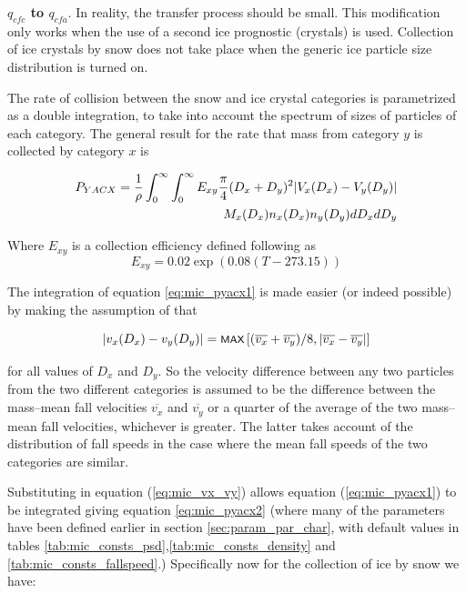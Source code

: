 \documentclass{UMDP_article}
\newcommand{\mmax}[1] {\mbox{\footnotesize \sf MAX} \left[#1\right]  }
\def\bq{\begin{equation}}
\def\eq{\end{equation}}
\begin{document}
\textbf{$q_{cfc}$ to $q_{cfa}$}.
In reality, the
transfer process should be small. This modification only works when the use of 
a second ice prognostic (crystals) is used. Collection of ice crystals by snow
does not take place when the generic ice particle size distribution is turned 
on.

The rate of collision between the snow and ice crystal categories is
parametrized as a double integration, to take into account the spectrum of
sizes of particles of each category.
The general result for the rate that mass from category $y$ is collected 
by category $x$ is

\begin{eqnarray}
 P_{YACX}=\frac{1}{\rho}
          \int_0^\infty\int_0^\infty E_{xy}\frac{\pi}{4}(D_x+D_y)^2
         | V_x(D_x) - V_y(D_y)|
                         \nonumber \\
          \hspace{0.5cm}M_x(D_x) n_x(D_x) n_y(D_y) dD_x dD_y
\label{eq:mic_pyacx1}
\end{eqnarray}

Where $E_{xy}$ is a collection efficiency defined following 
\cite{Gray:etal:2004} as
\bq
E_{xy}= 0.02 \exp ( 0.08 (T - 273.15))
\label{eq:mic_exy}
\eq

The integration of equation \ref{eq:mic_pyacx1} is made easier 
(or indeed possible) by making the assumption of \cite{Forbes:Halliwell:2003}
that

\bq
| v_x(D_x) - v_y(D_y) | =\mmax{(\overline{v_x}+\overline{v_y})/8,| \overline{v_x} 
- \overline{v_y} |}
\label{eq:mic_vx_vy}
\eq

for all values of $D_x$ and $D_y$. So the velocity difference between any two
particles from the two different categories is assumed to be the difference
between the mass--mean fall velocities $\overline{v_x}$ and $\overline{v_y}$ 
or a quarter of the average of the two mass--mean fall velocities, whichever is 
greater. The latter takes account of the distribution of fall speeds in the 
case where the mean fall speeds of the two categories are similar.

Substituting in equation (\ref{eq:mic_vx_vy}) allows equation
(\ref{eq:mic_pyacx1}) to be integrated giving equation \ref{eq:mic_pyacx2} 
(where many of the parameters have been defined earlier in 
section \ref{sec:param_par_char}, with default values 
in tables \ref{tab:mic_consts_psd},\ref{tab:mic_consts_density} and 
\ref{tab:mic_consts_fallspeed}.) Specifically now for the collection
of ice by snow we have: 
\end{document}
